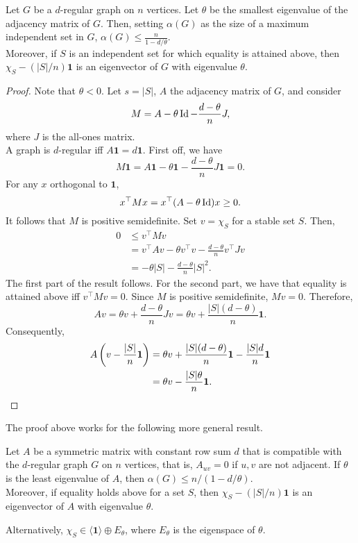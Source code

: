 \begin{flem}
	\label{lem:ratio-bound}
	Let $G$ be a $d$-regular graph on $n$ vertices. Let $\theta$ be the smallest eigenvalue of the adjacency matrix of $G$. Then, setting $\alpha(G)$ as the size of a maximum independent set in $G$, $\alpha(G) \le \frac{n}{1-d/\theta}$.\\
	Moreover, if $S$ is an independent set for which equality is attained above, then $\chi_S - (|S|/n) \mathbf{1}$ is an eigenvector of $G$ with eigenvalue $\theta$.
\end{flem}
\begin{proof}
	Note that $\theta < 0$. Let $s = |S|$, $A$ the adjacency matrix of $G$, and consider
	\[ M = A - \theta \operatorname{Id} - \frac{d-\theta}{n}J, \]
	where $J$ is the all-ones matrix.\\
	A graph is $d$-regular iff $A\mathbf{1} = d\mathbf{1}$.%
	First off, we have
	\[ M \mathbf{1} = A \mathbf{1} - \theta \mathbf{1} - \frac{d-\theta}{n} J \mathbf{1} = 0. \]
	For any $x$ orthogonal to $\mathbf{1}$,
	\[ x^\top M x = x^\top(A-\theta \operatorname{Id})x \ge 0. \]
	It follows that $M$ is positive semidefinite. Set $v = \chi_S$ for a stable set $S$. Then,
	\begin{align*}
		0 &\le v^\top M v \\
			&= v^\top A v - \theta v^\top v - \frac{d-\theta}{n} v^\top J v \\
			&= -\theta |S| - \frac{d-\theta}{n}|S|^2.
	\end{align*}
	The first part of the result follows. For the second part, we have that equality is attained above iff $v^\top M v = 0$. Since $M$ is positive semidefinite, $Mv = 0$. Therefore,
	\[ Av = \theta v + \frac{d-\theta}{n} Jv = \theta v + \frac{|S|(d-\theta)}{n} \mathbf{1}. \]
	Consequently,
	\begin{align*}
		A\left(v - \frac{|S|}{n} \mathbf{1}\right) &= \theta v + \frac{|S|(d-\theta)}{n} \mathbf{1} - \frac{|S|d}{n} \mathbf{1} \\
			&= \theta v - \frac{|S|\theta}{n} \mathbf{1}. \qedhere
	\end{align*}
\end{proof}

The proof above works for the following more general result.

\begin{flem}
	Let $A$ be a symmetric matrix with constant row sum $d$ that is compatible with the $d$-regular graph $G$ on $n$ vertices, that is, $A_{uv} = 0$ if $u,v$ are not adjacent. If $\theta$ is the least eigenvalue of $A$, then $\alpha(G) \le n / (1 - d/\theta)$.\\
	Moreover, if equality holds above for a set $S$, then $\chi_S - (|S|/n)\mathbf{1}$ is an eigenvector of $A$ with eigenvalue $\theta$.
\end{flem}
Alternatively, $\chi_S \in \langle \mathbf{1}\rangle \oplus E_\theta$, where $E_\theta$ is the eigenspace of $\theta$.\\

